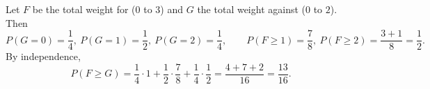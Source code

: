 Let $F$ be the total weight for ($0$ to $3$) and $G$ the total weight against ($0$ to $2$). Then
\[P(G=0)=\dfrac14,\ P(G=1)=\dfrac12,\ P(G=2)=\dfrac14,\qquad P(F\ge1)=\dfrac78,\ P(F\ge2)=\dfrac{3+1}{8}=\dfrac12.\]
By independence,
\[P(F\ge G)=\dfrac14\cdot1+\dfrac12\cdot\dfrac78+\dfrac14\cdot\dfrac12=\dfrac{4+7+2}{16}=\boxed{\dfrac{13}{16}}.\]
